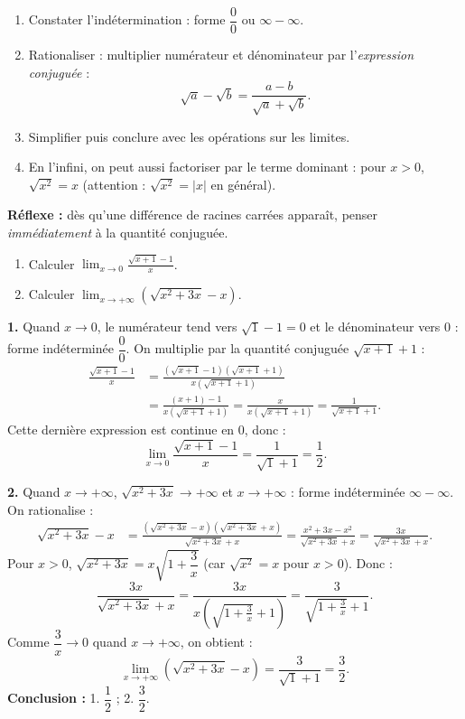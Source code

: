 \documentclass[11pt]{article}
\newcommand{\cle}[1]{{\popxbold\color{popdark}#1}}
\begin{document}
\begin{methode}
\begin{enumerate}
\item \cle{Constater l'indétermination} : forme $\dfrac{0}{0}$ ou $\infty-\infty$.
\item \cle{Rationaliser} : multiplier numérateur et dénominateur par l'\emph{expression conjuguée} :
\[ \sqrt{a}-\sqrt{b}=\frac{a-b}{\sqrt{a}+\sqrt{b}}. \]
\item \cle{Simplifier} puis conclure avec les opérations sur les limites.
\item \cle{En l'infini}, on peut aussi factoriser par le terme dominant : pour $x>0$, $\sqrt{x^2}=x$ (attention : $\sqrt{x^2}=|x|$ en général).
\end{enumerate}
\textbf{Réflexe :} dès qu'une différence de racines carrées apparaît, penser \emph{immédiatement} à la quantité conjuguée.
\end{methode}

\begin{exoresolu}
\begin{enumerate}
\item Calculer $\displaystyle\lim_{x\to 0}\frac{\sqrt{x+1}-1}{x}$.
\item Calculer $\displaystyle\lim_{x\to +\infty}\left(\sqrt{x^2+3x}-x\right)$.
\end{enumerate}
\tcblower
\textbf{1.} Quand $x\to 0$, le numérateur tend vers $\sqrt{1}-1=0$ et le dénominateur vers $0$ : forme indéterminée $\dfrac{0}{0}$. On multiplie par la quantité conjuguée $\sqrt{x+1}+1$ :
\begin{align*}
\frac{\sqrt{x+1}-1}{x} &= \frac{(\sqrt{x+1}-1)(\sqrt{x+1}+1)}{x(\sqrt{x+1}+1)} \\
&= \frac{(x+1)-1}{x(\sqrt{x+1}+1)} = \frac{x}{x(\sqrt{x+1}+1)} = \frac{1}{\sqrt{x+1}+1}.
\end{align*}
Cette dernière expression est continue en $0$, donc :
\[ \lim_{x\to 0}\frac{\sqrt{x+1}-1}{x}=\frac{1}{\sqrt{1}+1}=\frac{1}{2}. \]

\textbf{2.} Quand $x\to+\infty$, $\sqrt{x^2+3x}\to+\infty$ et $x\to+\infty$ : forme indéterminée $\infty-\infty$. On rationalise :
\begin{align*}
\sqrt{x^2+3x}-x &= \frac{(\sqrt{x^2+3x}-x)(\sqrt{x^2+3x}+x)}{\sqrt{x^2+3x}+x} = \frac{x^2+3x-x^2}{\sqrt{x^2+3x}+x} = \frac{3x}{\sqrt{x^2+3x}+x}.
\end{align*}
Pour $x>0$, $\sqrt{x^2+3x}=x\sqrt{1+\dfrac{3}{x}}$ (car $\sqrt{x^2}=x$ pour $x>0$). Donc :
\[ \frac{3x}{\sqrt{x^2+3x}+x}=\frac{3x}{x\left(\sqrt{1+\frac{3}{x}}+1\right)}=\frac{3}{\sqrt{1+\frac{3}{x}}+1}. \]
Comme $\dfrac{3}{x}\to 0$ quand $x\to+\infty$, on obtient :
\[ \lim_{x\to +\infty}\left(\sqrt{x^2+3x}-x\right)=\frac{3}{\sqrt{1}+1}=\frac{3}{2}. \]
\textbf{Conclusion :} 1. $\dfrac{1}{2}$ ; 2. $\dfrac{3}{2}$.
\end{exoresolu}
\end{document}
